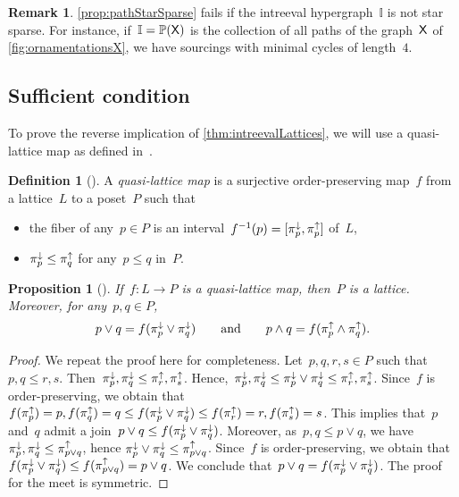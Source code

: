 \documentclass{amsart}
\newtheorem{proposition}[theorem]{Proposition}
\theoremstyle{definition}
\newtheorem{definition}[theorem]{Definition}
\newtheorem{remark}[theorem]{Remark}
\newcommand{\darkblue}{\color{darkblue}} %
\newcommand{\defn}[1]{\textsl{\darkblue #1}} %
\newcommand{\meet}{\wedge} %
\newcommand{\join}{\vee} %
\newcommand{\projDown}[1]{\smash{\pi^\downarrow_{#1}}} %
\newcommand{\projUp}[1]{\smash{\pi^\uparrow_{#1}}} %
\newcommand{\II}{\mathbb I} %
\newcommand{\PP}{\mathbb P} %
\newcommand{\Xgraph}{\sf X} %
\begin{document}
\begin{remark}
\cref{prop:pathStarSparse} fails if the intreeval hypergraph~$\II$ is not star sparse.
For instance, if~$\II = \PP(\Xgraph)$ is the collection of all paths of the graph~$\Xgraph$ of \cref{fig:ornamentationsX}, we have sourcings with minimal cycles of length~$4$.
\end{remark}


\subsection{Sufficient condition}
\label{subsec:sufficient}

To prove the reverse implication of \cref{thm:intreevalLattices}, we will use a quasi-lattice map as defined in~\cite[Rem.~4.14]{BergeronPilaud}.

\begin{definition}[{\cite[Rem.~4.14]{BergeronPilaud}}]
\label{def:quasiLatticeMap}
A \defn{quasi-lattice map} is a surjective order-preserving map~$f$ from a lattice~$L$ to a poset~$P$ such that
\begin{itemize}
\item the fiber of any~$p \in P$ is an interval~$f^{-1}(p) = [\projDown{p}, \projUp{p}]$ of~$L$,
\item $\projDown{p} \le \projUp{q}$ for any~$p \le q$ in~$P$.
\end{itemize}
\end{definition}

\begin{proposition}[{\cite[Rem.~4.14]{BergeronPilaud}}]
\label{prop:quasiLatticeMap}
If~$f : L \to P$ is a quasi-lattice map, then~$P$ is a lattice. 
Moreover, for any~$p,q \in P$,
\[
p \join q = f(\projDown{p} \join \projDown{q})
\qquad\text{and}\qquad
p \meet q = f(\projUp{p} \meet \projUp{q}).
\]
\end{proposition}

\begin{proof}
We repeat the proof here for completeness.
Let~$p,q,r,s \in P$ such that~$p, q \le r, s$.
Then~$\projDown{p}, \projDown{q} \le \projUp{r},  \projUp{s}$.
Hence,~$\projDown{p}, \projDown{q} \le \projDown{p} \join \projDown{q} \le \projUp{r}, \projUp{s}$.
Since~$f$ is order-preserving, we obtain that~$f(\projUp{p}) = p, f(\projUp{q}) = q \le f(\projDown{p} \join \projDown{q}) \le f(\projUp{r}) = r, f(\projUp{s}) = s$.
This implies that~$p$ and~$q$ admit a join~$p \join q \le f(\projDown{p} \join \projDown{q})$.
Moreover, as~$p, q \le p \join q$, we have~$\projDown{p}, \projDown{q} \le \projUp{p \join q}$, hence $\projDown{p} \join \projDown{q} \le \projUp{p \join q}$.
Since~$f$ is order-preserving, we obtain that~$f(\projDown{p} \join \projDown{q}) \le f(\projUp{p \join q}) = p \join q$.
We conclude that~$p \join q = f(\projDown{p} \join \projDown{q})$.
The proof for the meet is symmetric.
\end{proof}
\end{document}
